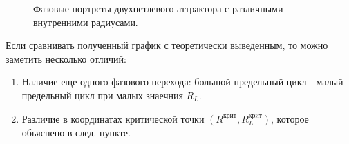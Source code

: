 \documentclass[12pt]{article}
\begin{document}
\begin{figure}[H]
	\centering
	\begin{minipage}[h]{0.47\linewidth}
	\end{minipage}
	\hfill
	\begin{minipage}[h]{0.47\linewidth}
	\end{minipage}
	\caption{Фазовые портреты двухпетлевого аттрактора с различными внутренними радиусами.}
	\label{fig:real_fig_3}
\end{figure}

Если сравнивать полученный график с теоретически выведенным, то можно заметить несколько отличий:
\begin{enumerate}
	\item Наличие еще одного фазового перехода: большой предельный цикл - малый предельный цикл при малых знаечния $R_L$.
	\item Различие в координатах критической точки $(R^{\text{крит}}, R_L^{\text{крит}})$, которое обьяснено в след. пункте.
\end{enumerate}
\end{document}
